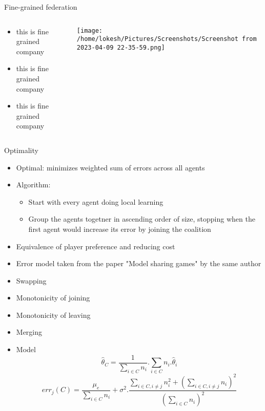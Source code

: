 \documentclass[presentation]{beamer}
\begin{document}
\begin{frame}[label={sec:org855faeb}]{Fine-grained federation}
\begin{columns}
\begin{column}{0.5\columnwidth}
\begin{itemize}
\item this is fine grained company
\item this is fine grained company
\item this is fine grained company
\end{itemize}
\end{column}
\begin{column}{0.5\columnwidth}
\begin{example}\label{sec:orge0ef8e5}
\begin{center}
\texttt{[image: /home/lokesh/Pictures/Screenshots/Screenshot from 2023-04-09 22-35-59.png]}
\end{center}
\end{example}
\end{column}
\end{columns}
\end{frame}
\begin{frame}[label={sec:org78ed917}]{Optimality}
\begin{itemize}
\item Optimal: minimizes weighted sum of errors across all agents
\item Algorithm:
\begin{itemize}
\item Start with every agent doing local learning
\item Group the agents togetner in ascending order of size, stopping when the first agent would increase its error by joining the coalition
\end{itemize}
\item Equivalence of player preference and reducing cost
\end{itemize}

\begin{NOTES}
\begin{itemize}
\item Error model taken from the paper "Model sharing games" by the same author
\end{itemize}
\end{NOTES}

\begin{itemize}
\item Swapping
\item Monotonicity of joining
\item Monotonicity of leaving
\item Merging
\end{itemize}

\begin{itemize}
\item Model
\[ \hat{\theta}_C = \frac{1}{\sum_{i \in C} n_i} . \sum_{i \in C} n_i . \hat{\theta}_i\]
\[ err_j(C) = \frac{\mu_e}{\sum_{i \in C}n_i} + \sigma^2 . \frac{\sum_{i \in C, i \neq j} n_i^2 + \left( \sum_{i \in C, i \neq j} n_i \right)^2}{\left( \sum_{i \in C} n_i \right)^2}\]
\end{itemize}
\end{frame}
\end{document}

